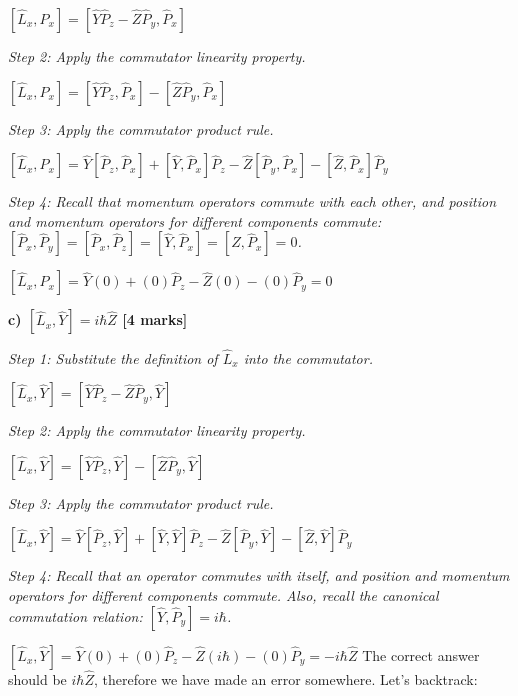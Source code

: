 \documentclass{article}
\begin{document}
$\left[\hat{L}_x, \hat{P}_x\right] = \left[\hat{Y}\hat{P}_z - \hat{Z}\hat{P}_y, \hat{P}_x\right]$

\textit{Step 2: Apply the commutator linearity property.}

$\left[\hat{L}_x, \hat{P}_x\right] = \left[\hat{Y}\hat{P}_z, \hat{P}_x\right] - \left[\hat{Z}\hat{P}_y, \hat{P}_x\right]$

\textit{Step 3: Apply the commutator product rule.}

$\left[\hat{L}_x, \hat{P}_x\right] = \hat{Y}\left[\hat{P}_z, \hat{P}_x\right] + \left[\hat{Y}, \hat{P}_x\right]\hat{P}_z - \hat{Z}\left[\hat{P}_y, \hat{P}_x\right] - \left[\hat{Z}, \hat{P}_x\right]\hat{P}_y$

\textit{Step 4: Recall that momentum operators commute with each other, and position and momentum operators for different components commute: $\left[\hat{P}_x, \hat{P}_y\right] = \left[\hat{P}_x, \hat{P}_z\right] = \left[\hat{Y}, \hat{P}_x\right] = \left[\hat{Z}, \hat{P}_x\right] = 0$.}

$\left[\hat{L}_x, \hat{P}_x\right] = \hat{Y}(0) + (0)\hat{P}_z - \hat{Z}(0) - (0)\hat{P}_y = 0$

\textbf{c) $\left[\hat{L}_x, \hat{Y}\right] = i\hbar \hat{Z}$ [4 marks]}

\textit{Step 1: Substitute the definition of $\hat{L}_x$ into the commutator.}

$\left[\hat{L}_x, \hat{Y}\right] = \left[\hat{Y}\hat{P}_z - \hat{Z}\hat{P}_y, \hat{Y}\right]$

\textit{Step 2: Apply the commutator linearity property.}

$\left[\hat{L}_x, \hat{Y}\right] = \left[\hat{Y}\hat{P}_z, \hat{Y}\right] - \left[\hat{Z}\hat{P}_y, \hat{Y}\right]$

\textit{Step 3: Apply the commutator product rule.}

$\left[\hat{L}_x, \hat{Y}\right] = \hat{Y}\left[\hat{P}_z, \hat{Y}\right] + \left[\hat{Y}, \hat{Y}\right]\hat{P}_z - \hat{Z}\left[\hat{P}_y, \hat{Y}\right] - \left[\hat{Z}, \hat{Y}\right]\hat{P}_y$

\textit{Step 4: Recall that an operator commutes with itself, and position and momentum operators for different components commute. Also, recall the canonical commutation relation: $\left[\hat{Y}, \hat{P}_y\right] = i\hbar$.}

$\left[\hat{L}_x, \hat{Y}\right] = \hat{Y}(0) + (0)\hat{P}_z - \hat{Z}(i\hbar) - (0)\hat{P}_y = -i\hbar\hat{Z}$
The correct answer should be $i\hbar\hat{Z}$, therefore we have made an error somewhere. Let's backtrack:
\end{document}

